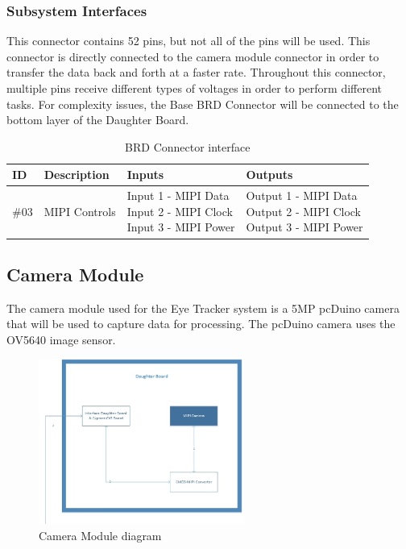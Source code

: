 \subsubsection{Subsystem Interfaces}
This connector contains 52 pins, but not all of the pins will be used. This connector is directly connected to the camera module connector in order to transfer the data back and forth at a faster rate.  Throughout this connector, multiple pins receive different types of voltages in order to perform different tasks. For complexity issues, the Base BRD Connector will be connected to the bottom layer of the Daughter Board.

\begin {table}[H]
\caption {BRD Connector interface}
\begin{center}
    \begin{tabular}{ | p{1cm} | p{6cm} | p{3cm} | p{3cm} |}
    \hline
    ID & Description & Inputs & Outputs \\ \hline
     \#03 & MIPI Controls & \pbox{3cm}{Input 1 - MIPI Data \\ Input 2 - MIPI Clock \\ Input 3 - MIPI Power} & \pbox{3cm}{Output 1 - MIPI Data \\ Output 2 - MIPI Clock \\ Output 3 - MIPI Power}  \\ \hline
    \end{tabular}
\end{center}
\end{table}

\subsection{Camera Module}
The camera module used for the Eye Tracker system is a 5MP pcDuino camera that will be used to capture data for processing. The pcDuino camera uses the OV5640 image sensor.

\begin{figure}[h!]
	\centering
 	\includegraphics[width=0.60\textwidth]{images/DaughterBoard_Camera.jpg}
 \caption{Camera Module diagram}
\end{figure}

